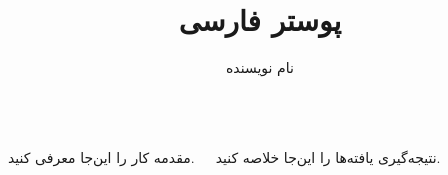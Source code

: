 \documentclass{beamer}
\title{پوستر فارسی}
\author{نام نویسنده}
\begin{document}
\begin{frame}
\begin{columns}[t]
  \begin{block}{مقدمه}
    کار را این‌جا معرفی کنید.
  \end{block}
  \begin{block}{نتیجه‌گیری}
    یافته‌ها را این‌جا خلاصه کنید.
  \end{block}
\end{columns}
\end{frame}
\end{document}
